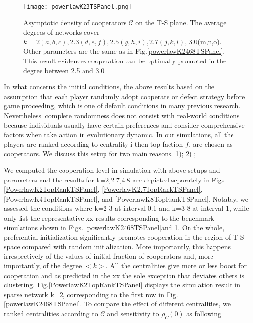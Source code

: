 \documentclass[preprint,12pt,3p]{elsarticle}
\begin{document}
\begin{figure}[htbp]
\centering
\texttt{[image: powerlawK23TSPanel.png]}

\caption{Asymptotic density of cooperators $\mathcal{C}$ on the T-S plane.
The average degrees of networks cover $k=2(a,b,c),2.3(d,e,f),2.5(g,h,i),2.7(j,k,l)$, 3.0(m,n,o).
Other parameters are the same as in Fig.\ref{powerlawK2468TSPanel}.
This result evidences cooperation can be optimally promoted in the degree between 2.5 and 3.0.}
\label{powerlawK23TSPanel}
\end{figure}

    In what concerns the initial conditions, the above results based on the assumption
that each player randomly adopt cooperate or defect strategy before game proceeding,
which is one of default conditions in many previous research.
Nevertheless, complete randomness does not consist with real-world conditions
because individuals usually have certain preferences and consider comprehensive factors
when take action in evolutionary dynamic.
In our simulations, all the players are ranked according to centrality i then top faction $f_c$
are chosen as cooperators.
We discuss this setup for two main reasons. 1); 2) ;

    We computed the cooperation level in simulation with above setups and parameters and
the results for k=2,2.7,4,8 are depicted separately in Figs.\ref{PowerlawK2TopRankTSPanel}, \ref{PowerlawK2.7TopRankTSPanel},
\ref{PowerlawK4TopRankTSPanel}, and \ref{PowerlawK8TopRankTSPanel}.
Notably, we assessed the conditions where k=2-3 at interval 0.1 and k=3-8 at interval 1,
while only list the representative xx results corresponding to the benchmark simulations shown in
Figs. \ref{powerlawK2468TSPanel}and \ref{powerlawK23TSPanel}.
    On the whole, preferential initialization significantly promotes cooperation in the region of T-S space
compared with random initialization.
More importantly, this happens irrespectively of the values of initial fraction of cooperators and, more importantly,
of the degree $<k>$.
All the centralities give more or less boost for cooperation and
as predicted in the xx the sole exception that deviates others is clustering.
    Fig.\ref{PowerlawK2TopRankTSPanel} displays the simulation result in sparse network k=2,
corresponding to the first row in Fig.\ref{powerlawK2468TSPanel}.
To compare the effect of different centralities, we ranked centralities according to $\mathcal{C}$
and sensitivity to $\rho_{C}(0)$ as following
\end{document}
